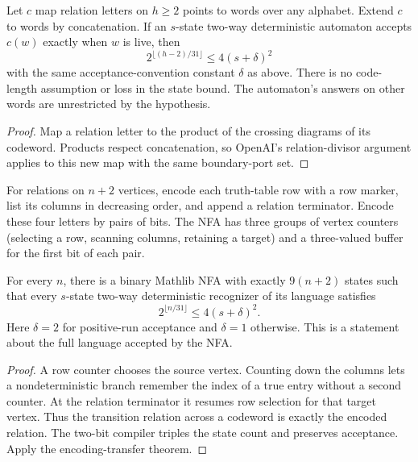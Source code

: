 \begin{corollary}
  \label{cor:models-encoded-liveness-lower}
  \leanok
  Let $c$ map relation letters on $h\ge2$ points to words over any alphabet.
  Extend $c$ to words by concatenation. If an $s$-state two-way deterministic
  automaton accepts $c(w)$ exactly when $w$ is live, then
  \[
    2^{\lfloor(h-2)/31\rfloor}\le4(s+\delta)^2
  \]
  with the same acceptance-convention constant $\delta$ as above.
  There is no code-length assumption or loss in the state bound. The
  automaton's answers on other words are unrestricted by the hypothesis.
\end{corollary}
\begin{proof}
  \leanok
  Map a relation letter to the product of the crossing diagrams of its
  codeword. Products respect concatenation, so OpenAI's relation-divisor
  argument applies to this new map with the same boundary-port set.
\end{proof}


\begin{definition}
  \label{def:models-binary-liveness}
  \leanok
  For relations on $n+2$ vertices, encode each truth-table row with a row
  marker, list its columns in decreasing order, and append a relation
  terminator. Encode these four letters by pairs of bits. The NFA has three
  groups of vertex counters (selecting a row, scanning columns, retaining a
  target) and a three-valued buffer for the first bit of each pair.
\end{definition}

\begin{corollary}
  \label{cor:models-binary-liveness-lower}
  \leanok
  For every $n$, there is a binary Mathlib NFA with exactly $9(n+2)$ states
  such that every $s$-state two-way deterministic recognizer of its language
  satisfies
  \[
    2^{\lfloor n/31\rfloor}\le4(s+\delta)^2.
  \]
  Here $\delta=2$ for positive-run acceptance and $\delta=1$ otherwise.
  This is a statement about the full language accepted by the NFA.
\end{corollary}
\begin{proof}
  \leanok
  A row counter chooses the source vertex. Counting down the columns lets
  a nondeterministic branch remember the index of a true entry without a
  second counter. At the relation terminator it resumes row selection for
  that target vertex. Thus the transition relation across a codeword is
  exactly the encoded relation. The two-bit compiler triples the state
  count and preserves acceptance. Apply the encoding-transfer theorem.
\end{proof}

